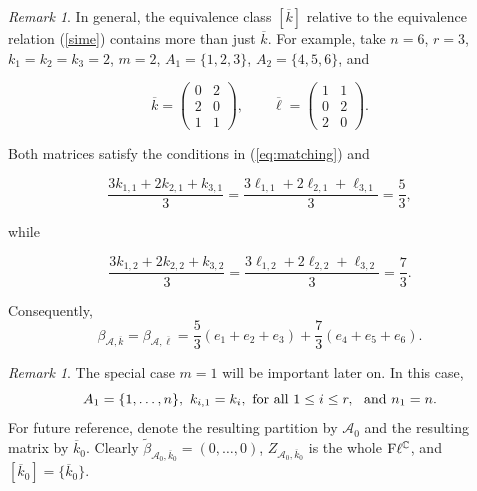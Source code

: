 \documentclass[12pt]{amsart}
\theoremstyle{definition}
\theoremstyle{remark}
\newtheorem{rem}[thm]{Remark}
\newcommand{\CC}{\mathbb C}
\newcommand{\vk}{\overline{k}}
\newcommand{\A}{{\mathcal A}}
\newcommand{\be}{\A, \vk}
\newcommand{\bet}{\tilde{\beta}}
\begin{document}
\begin{rem} \label{rem:more}
In general, the equivalence class $[\vk]$ relative to the equivalence relation (\ref{sime}) contains more than just $\vk$.  
For example, take $n=6$, $r=3$, $k_1=k_2=k_3=2$, $m=2$, $A_1=\{1,2,3\}$, $A_2=\{4,5,6\}$, and

$$
\overline{k}=
\begin{pmatrix}
0&2\\
2&0\\
1&1
\end{pmatrix},
\qquad
\overline{\ell}=
\begin{pmatrix}
1&1\\
0&2\\
2&0
\end{pmatrix}.
$$

Both matrices satisfy the conditions in (\ref{eq:matching}) and 

$$\frac{3k_{1,1}+2k_{2,1}+k_{3,1}}{3}=\frac{3\ell_{1,1}+2\ell_{2,1}+\ell_{3,1}}{3}
=\frac{5}{3},
$$

while

$$\frac{3k_{1,2}+2k_{2,2}+k_{3,2}}{3}=\frac{3\ell_{1,2}+2\ell_{2,2}+\ell_{3,2}}{3}
=\frac{7}{3}.$$

Consequently,  $$\beta_{\A,\vk}=\beta_{\A, \overline{\ell}}
=\frac{5}{3}(e_1+e_2+e_3)
+
\frac{7}{3}(e_4+e_5+e_6).
$$


\end{rem}

\begin{rem}\label{betaz} The special case $m=1$ will be important later on. In this case,
$$A_1=\{1, \ldots, n\}, \ k_{i,1}=k_i, \ {\rm for \ all} \  1 \le i \le r, \  \ {\rm and} \ n_1=n.$$
For future reference, denote the resulting partition by 
$\A_0$ and the resulting matrix by $\vk_0$. 
Clearly $\tilde{\beta}_{\A_0, \vk_0}=(0, \ldots, 0)$, 
$Z_{\A_0, \vk_0}$ is the whole ${\rm F}\ell^\CC$, and $[\overline{k}_0]=\{\overline{k}_0\}$. 
\end{rem}
\end{document}
